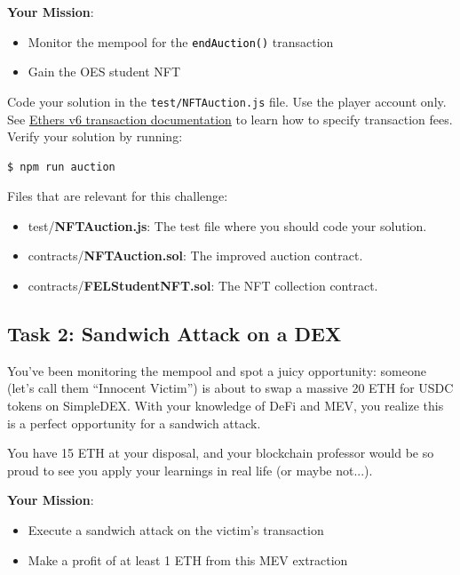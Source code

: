 \documentclass[12pt]{article}
\newcommand{\codegrey}[1]{%
  \texttt{\colorbox{black!4}{\textcolor{black}{#1}}}%
}
\begin{document}
\medskip
\noindent
\textbf{Your Mission}:
\begin{itemize}
    \item Monitor the mempool for the \codegrey{endAuction()} transaction
    \item Gain the OES student NFT
\end{itemize}

\noindent
Code your solution in the \texttt{test/NFTAuction.js} file. Use the player account only. See \href{https://docs.ethers.org/v6/api/transaction/\#Transaction}{Ethers v6 transaction documentation} to learn how to specify transaction fees. Verify your solution by running:

\begin{verbatim}
$ npm run auction
\end{verbatim}

\noindent
Files that are relevant for this challenge:
\begin{itemize}
\item test/\textbf{NFTAuction.js}: The test file where you should code your solution.
\item contracts/\textbf{NFTAuction.sol}: The improved auction contract.
\item contracts/\textbf{FELStudentNFT.sol}: The NFT collection contract.
\end{itemize}

\subsection*{Task 2: Sandwich Attack on a DEX}

You've been monitoring the mempool and spot a juicy opportunity: someone (let's call them ``Innocent Victim'') is about to swap a massive 20 ETH for USDC tokens on SimpleDEX. With your knowledge of DeFi and MEV, you realize this is a perfect opportunity for a sandwich attack.

You have 15 ETH at your disposal, and your blockchain professor would be so proud to see you apply your learnings in real life (or maybe not...).

\medskip
\noindent
\textbf{Your Mission}:
\begin{itemize}
  \item Execute a sandwich attack on the victim's transaction
  \item Make a profit of at least 1 ETH from this MEV extraction
\end{itemize}
\end{document}
